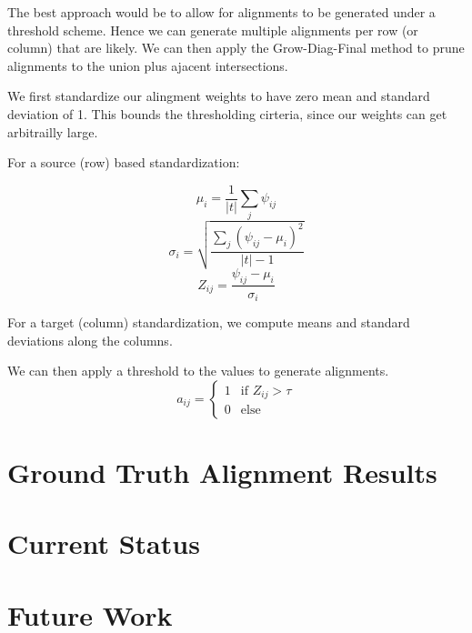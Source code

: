 \documentclass[twoside,twocolumn]{article}
\begin{document}
The best approach would be to allow for alignments to be generated
under a threshold scheme. Hence we can generate multiple alignments
per row (or column) that are likely. We can then apply the
Grow-Diag-Final method to prune alignments to the union plus
ajacent intersections.


We first standardize our alingment weights to have zero mean and
standard deviation of 1. This bounds the thresholding cirteria,
since our weights can get arbitrailly large.

For a source (row) based standardization:

\begin{equation}
  \mu_{i} = \frac{1}{|t|} \sum_j \psi_{ij}
\end{equation}
\begin{equation}
  \sigma_{i} = \sqrt{\frac{\sum_j \left( \psi_{ij} - \mu_i \right)^2}{|t|-1}}
\end{equation}
\begin{equation}
  Z_{ij} = \frac{\psi_{ij} - \mu_i}{\sigma_i}
\end{equation}

For a target (column) standardization, we compute means and
standard deviations along the columns.

We can then apply a threshold to the values to generate alignments.
\begin{equation}
  a_{ij} = \begin{cases}
    1 & \text{if } Z_{ij} > \tau \\
    0 & \text{else}
  \end{cases}
\end{equation}


\section{Ground Truth Alignment Results}

\section{Current Status}

\section{Future Work}



\end{document}
